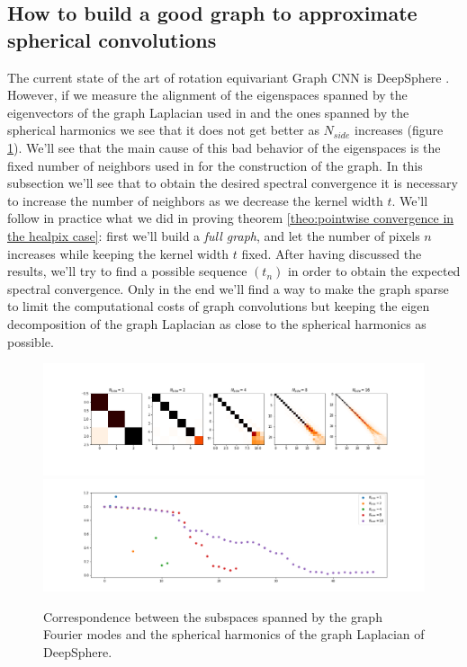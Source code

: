 \subsection{How to build a good graph to approximate spherical convolutions}
\label{sec:Chapter2:How to build a good graph}
The current state of the art of rotation equivariant Graph CNN is DeepSphere \cite{DeepSphere}. However, if we measure the alignment of the eigenspaces spanned by the eigenvectors of the graph Laplacian used in \cite{DeepSphere} and the ones spanned by the spherical harmonics we see that it does not get better as $N_{side}$ increases (figure \ref{fig:deepsphere results}). We'll see that the main cause of this bad behavior of the eigenspaces is the fixed number of neighbors used in \cite{DeepSphere} for the construction of the graph. In this subsection we'll see that to obtain the desired spectral convergence it is necessary to increase the number of neighbors as we decrease the kernel width $t$. We'll follow in practice what we did in proving theorem \ref{theo:pointwise convergence in the healpix case}: first we'll build a \textit{full graph}, and let the number of pixels $n$ increases while keeping the kernel width $t$ fixed. After having discussed the results, we'll try to find a possible sequence $(t_n)$ in order to obtain the expected spectral convergence. Only in the end we'll find a way to make the graph sparse to limit the computational costs of graph convolutions but keeping the eigen decomposition of the graph Laplacian as close to the spherical harmonics as possible.
\begin{figure}[h!]
	\centering
	\includegraphics[width=\textwidth]{../codes/02.HeatKernelGraphLaplacian/HEALPix/06_figures/deepsphere_original.png}
		\includegraphics[width=\textwidth]{../codes/02.HeatKernelGraphLaplacian/HEALPix/06_figures/deepsphere_original_diagonal.png}	
		\caption{\label{fig:deepsphere results}Correspondence between the subspaces spanned by the graph Fourier modes and the spherical harmonics of the graph Laplacian of DeepSphere.}
\end{figure}

